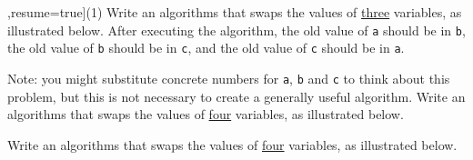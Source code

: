 \begin{exercise}
    \begin{longtasks}[counter-format=3.tsk[1],resume=true](1)
        \task
        Write an algorithms that swaps the values of \underline{three} variables, as illustrated below. After executing the algorithm, the old value of \texttt{a} should be in \texttt{b}, the old value of \texttt{b} should be in \texttt{c}, and the old value of \texttt{c} should be in \texttt{a}.

        \SetVertexNormal[Shape      = circle,
        LineWidth  = .7pt]
        \SetUpEdge[lw         = .7pt,
        color      = black]
        \begin{center}
        \end{center}

        Note: you might substitute concrete numbers for \texttt{a}, \texttt{b} and \texttt{c} to think about this problem, but this is not necessary to create a generally useful algorithm.
        \task
        Write an algorithms that swaps the values of \underline{four} variables, as illustrated below.

        \SetVertexNormal[Shape      = circle,
        LineWidth  = .7pt]
        \SetUpEdge[lw         = .7pt,
        color      = black]
        \begin{center}
        \end{center}
        \task
        Write an algorithms that swaps the values of \underline{four} variables, as illustrated below.


\end{longtasks}
\end{exercise}
